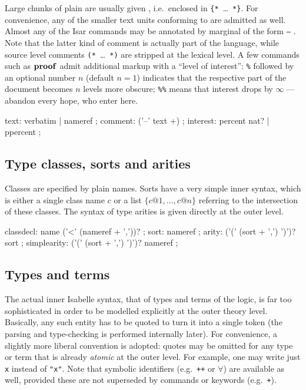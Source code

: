 Large chunks of plain  are usually given
, i.e.\ enclosed in \verb|{*|~\dots~\verb|*}|.  For
convenience, any of the smaller text units conforming to 
are admitted as well.  Almost any of the Isar commands may be annotated by
marginal  of the form \texttt{--} .
Note that the latter kind of comment is actually part of the language, while
source level comments \verb|(*|~\dots~\verb|*)| are stripped at the lexical
level.  A few commands such as ${\mathord{\mathbf{proof}}}$ admit additional markup with a
``level of interest'': \texttt{\%} followed by an optional number $n$ (default
$n = 1$) indicates that the respective part of the document becomes $n$ levels
more obscure; \texttt{\%\%} means that interest drops by $\infty$ --- abandon
every hope, who enter here.

\begin{rail}
  text: verbatim | nameref
  ;
  comment: ('--' text +)
  ;
  interest: percent nat? | ppercent
  ;
\end{rail}


\subsection{Type classes, sorts and arities}

Classes are specified by plain names.  Sorts have a very simple inner syntax,
which is either a single class name $c$ or a list $\{c@1, \dots, c@n\}$
referring to the intersection of these classes.  The syntax of type arities is
given directly at the outer level.

\begin{rail}
  classdecl: name ('<' (nameref + ','))?
  ;
  sort: nameref
  ;
  arity: ('(' (sort + ',') ')')? sort
  ;
  simplearity: ('(' (sort + ',') ')')? nameref
  ;
\end{rail}


\subsection{Types and terms}\label{sec:types-terms}

The actual inner Isabelle syntax, that of types and terms of the logic, is far
too sophisticated in order to be modelled explicitly at the outer theory
level.  Basically, any such entity has to be quoted to turn it into a single
token (the parsing and type-checking is performed internally later).  For
convenience, a slightly more liberal convention is adopted: quotes may be
omitted for any type or term that is already \emph{atomic} at the outer level.
For example, one may write just \texttt{x} instead of \texttt{"x"}.  Note that
symbolic identifiers (e.g.\ \texttt{++} or $\forall$) are available as well,
provided these are not superseded by commands or keywords (e.g.\ \texttt{+}).

